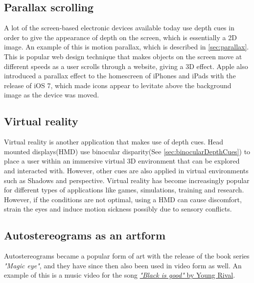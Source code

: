 	\subsection{Parallax scrolling}
	A lot of the screen-based electronic devices available today use depth cues in order to give the appearance of depth on the screen, which is essentially a 2D image. An example of this is motion parallax, which is described in \autoref{sec:parallax}. This is popular web design technique that makes objects on the screen move at different speeds as a user scrolls through a website, giving a 3D effect\citep{parallaxWeb}. Apple also introduced a parallax effect to the homescreen of iPhones and iPads with the release of iOS 7, which made icons appear to levitate above the background image as the device was moved\citep{ios7}.

	\subsection{Virtual reality}
	Virtual reality is another application that makes use of depth cues. Head mounted displays(HMD) use binocular disparity(See \autoref{sec:binocularDepthCues}) to place a user within an immersive virtual 3D environment that can be explored and interacted with\citep{hmdCues}. However, other cues are also applied in virtual environments such as Shadows and perspective. Virtual reality has become increasingly popular for different types of applications like games, simulations, training and research. However, if the conditions are not optimal, using a HMD can cause discomfort, strain the eyes and induce motion sickness possibly due to sensory conflicts\citep{hmdCues,motionSickness}.

	\subsection{Autostereograms as an artform}
	Autostereograms became a popular form of art with the release of the book series \textit{"Magic eye"}\citep{autostereograms}, and they have since then also been used in video form as well. An example of this is a music video for the song \href{https://www.youtube.com/watch?v=2AKtp3XHn38}{\color{blue}\textit{"Black is good"} by Young Rival}.

